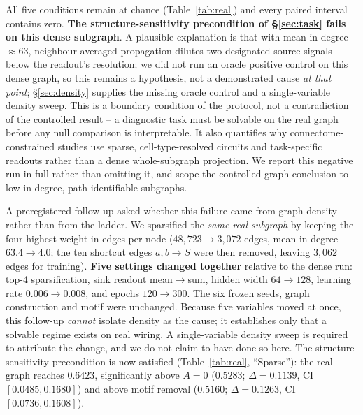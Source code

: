 \documentclass[10pt,twocolumn,letterpaper]{article}
\begin{document}
All five conditions remain at chance (Table~\ref{tab:real}) and every paired
interval contains zero. \textbf{The structure-sensitivity precondition of
\S\ref{sec:task} fails on this dense subgraph}. A plausible explanation is
that with mean in-degree $\approx\!63$, neighbour-averaged propagation dilutes
two designated source signals below the readout's resolution; we did not run
an oracle positive control on this dense graph, so this remains a hypothesis,
not a demonstrated cause \emph{at that point}; \S\ref{sec:density} supplies the missing oracle control and a single-variable density sweep. This is a boundary
condition of the protocol, not a contradiction of the controlled result -- a
diagnostic task must be solvable on the real graph before any null comparison
is interpretable. It also quantifies why connectome-constrained studies use
sparse, cell-type-resolved circuits and task-specific readouts rather than a
dense whole-subgraph projection. We report this negative run in full rather
than omitting it, and scope the controlled-graph conclusion to low-in-degree,
path-identifiable subgraphs.

A preregistered follow-up asked whether this failure came from graph density
rather than from the ladder. We sparsified the \emph{same real subgraph} by
keeping the four highest-weight in-edges per node ($48{,}723 \to 3{,}072$
edges, mean in-degree $63.4 \to 4.0$; the ten shortcut edges
$a,b\!\to\!S$ were then removed, leaving $3{,}062$ edges for training).
\textbf{Five settings changed together} relative to the dense run: top-4
sparsification, sink readout mean$\to$sum, hidden width $64\!\to\!128$,
learning rate $0.006\!\to\!0.008$, and epochs $120\!\to\!300$. The six frozen
seeds, graph construction and motif were unchanged. Because five variables
moved at once, this follow-up \emph{cannot} isolate density as the cause; it
establishes only that a solvable regime exists on real wiring. A single-variable
density sweep is required to attribute the change, and we do not claim to have
done so here. The structure-sensitivity precondition is now satisfied
(Table~\ref{tab:real}, ``Sparse''): the real graph reaches $0.6423$,
significantly above $A\!=\!0$ ($0.5283$; $\Delta=0.1139$, CI
$[0.0485,0.1680]$) and above motif removal ($0.5160$; $\Delta=0.1263$, CI
$[0.0736,0.1608]$).
\end{document}
